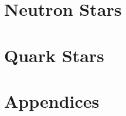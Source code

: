 \documentclass[a4paper,11pt,twoside,openright]{book}
\begin{document}
\frontmatter






\tableofcontents



\mainmatter

\part{Neutron Stars}\label{part:neutron-stars}







\part{Quark Stars}\label{part:quark-stars}






\appendix
\part{Appendices}\label{part:appendices}





\backmatter
\printbibliography[heading=bibintoc, title={References}]
\end{document}
